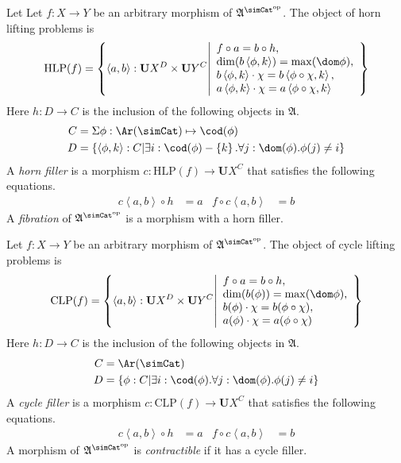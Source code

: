 \documentclass{tac}
\newcommand\set[1]{\left\{#1\right\}}
\newcommand\dual{^{\mathrm{op}}}
\newcommand\s{^{\simCat\dual}}
\newcommand\of{:}
\newcommand\tuplet[1]{\left\langle #1 \right\rangle}
\newcommand\base{\mathbf{U}}
\newcommand\ambient{\mathfrak A}
\newcommand\coproduct[2]{\Sigma #1 \mapsto #2}
\newcommand\keyword[1]{\emph{#1}\label{#1}}
\begin{document}
\newcommand\HLP{\mathrm{HLP}}
\begin{definition}
Let  Let $f\of X\to Y$ be an arbitrary morphism of $\ambient\s$. The object of horn lifting problems is 
\[\HLP(f) = \set{\tuplet{a,b}\of \base X^D\times \base Y^C \middle|\begin{array}{l}
  f\circ a = b\circ h,\\
  \dim(b\tuplet{\phi,k}) = \max(\dom\phi),\\
  b\tuplet{\phi,k}\cdot\chi = b\tuplet{\phi\circ \chi,k},\\
	a\tuplet{\phi,k}\cdot\chi = a\tuplet{\phi\circ \chi,k}
\end{array}}\]
Here $h\of D\to C$ is the inclusion of the following objects in $\ambient$.
\begin{align*}
C &= \coproduct{\phi\of\Ar(\simCat)}\cod(\phi) \\
D &= \set{\tuplet{\phi,k}\of C \middle| \exists i\of\cod(\phi)-\set k. \forall j\of\dom(\phi).\phi(j)\neq i}
\end{align*}
A \keyword{horn filler} is a morphism $c\of\HLP(f)\to \base X^C$ that satisfies the following equations. 
\begin{align*} c\tuplet{a,b}\circ h &= a & f\circ c\tuplet{a,b} &= b \end{align*}
A \emph{fibration} of $\ambient\s$ is a morphism with a horn filler.
\end{definition}

\newcommand\CLP{\mathrm{CLP}}
\begin{definition}
Let $f\of X\to Y$ be an arbitrary morphism of $\ambient\s$. The object of cycle lifting problems is 
\[\CLP(f) = \set{\tuplet{a,b}\of \base X^D\times \base Y^C \middle|\begin{array}{l}
  f\circ a = b\circ h,\\
  \dim(b(\phi)) = \max(\dom\phi),\\
  b(\phi)\cdot\chi = b(\phi\circ \chi),\\
  a(\phi)\cdot\chi = a(\phi\circ \chi)
\end{array}}\]
Here $h\of D\to C$ is the inclusion of the following objects in $\ambient$.
\begin{align*}
C &= \Ar(\simCat) \\
D &= \set{\phi\of C \middle| \exists i\of\cod(\phi).\forall j\of\dom(\phi).\phi(j)\neq i}
\end{align*}
A \keyword{cycle filler} is a morphism $c\of\CLP(f)\to \base X^C$ that satisfies the following equations. 
\begin{align*} c\tuplet{a,b}\circ h &= a & f\circ c\tuplet{a,b} &= b \end{align*}
A morphism  of $\ambient\s$ is \emph{contractible} if it has a cycle filler.
\end{definition}
\end{document}
